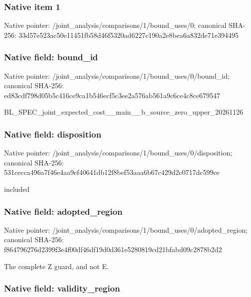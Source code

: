 \documentclass[10pt,a4paper]{article}
\begin{document}
\subsubsection{Native item 1}


Native pointer: /joint\_analysis/comparis\allowbreak{}ons/1/bound\_uses/0; canonical SHA-256: 33d57e523ac50e11451fb58d\allowbreak{}46f5320ad6227c190a2e8bea\allowbreak{}6a832de71e394495



\subsubsection{Native field: bound\_id}


Native pointer: /joint\_analysis/comparis\allowbreak{}ons/1/bound\_uses/0/bound\allowbreak{}\_id; canonical SHA-256: ed83cdf798d05b5c416ce9ca\allowbreak{}1b546ecf5c3ee2a576ab561a\allowbreak{}9c6ce4c8ce679547


BL\_SPEC\_joint\_expected\_c\allowbreak{}ost\_\_main\_\_b\_source\_zero\allowbreak{}\_upper\_20261126


\subsubsection{Native field: disposition}


Native pointer: /joint\_analysis/comparis\allowbreak{}ons/1/bound\_uses/0/dispo\allowbreak{}sition; canonical SHA-256: 531cecca496a7f46e4aa9ef4\allowbreak{}0641db12f8bef53aaa6b67c4\allowbreak{}29d2c0717dc599ce


included


\subsubsection{Native field: adopted\_region}


Native pointer: /joint\_analysis/comparis\allowbreak{}ons/1/bound\_uses/0/adopt\allowbreak{}ed\_region; canonical SHA-256: f864796276d2399f3e4f00df\allowbreak{}46df19d0d361e5280819cd21\allowbreak{}bfabd09c2878b2d2


The complete Z guard, and not E.


\subsubsection{Native field: validity\_region}
\end{document}
